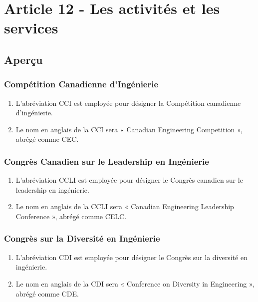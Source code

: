 \section{Article 12 - Les activités et les services}
\label{article-12-les-activites-et-les-services}

\subsection{Aperçu}
\label{apercu}
\subsubsection{Compétition Canadienne d’Ingénierie}
\label{competition-canadienne-d-ingenierie}
\begin{enumerate}
 \item L'abréviation CCI est employée pour désigner la Compétition canadienne d’ingénierie.
 \item Le nom en anglais de la CCI sera « Canadian Engineering Competition », abrégé comme CEC.
\end{enumerate}

\subsubsection{Congrès Canadien sur le Leadership en Ingénierie}
\label{congres-canadien-sur-le-leadership-en-ingenierie}
\begin{enumerate}
 \item L’abréviation CCLI est employée pour désigner le Congrès canadien sur le leadership en ingénierie.
 \item Le nom en anglais de la CCLI sera « Canadian Engineering Leadership Conference », abrégé comme CELC.
\end{enumerate}

\subsubsection{Congrès sur la Diversité en Ingénierie}
\label{congres-sur-la-diversite-en-ingenierie}
\begin{enumerate}
 \item L’abréviation CDI est employée pour désigner le Congrès sur la diversité en ingénierie.
 \item Le nom en anglais de la CDI sera « Conference on Diversity in Engineering », abrégé comme CDE.
\end{enumerate}

